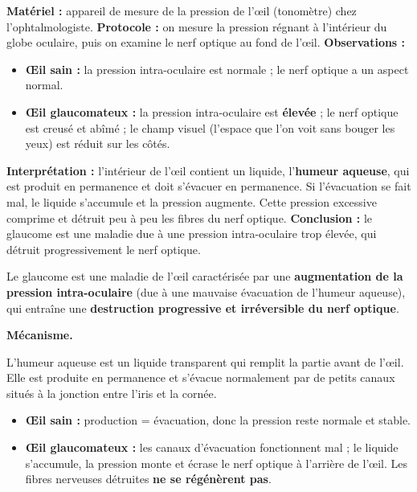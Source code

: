 \documentclass[11pt]{article}
\newcommand{\cle}[1]{{\popxbold\color{popdark}#1}}
\begin{document}
\begin{experience}
\textbf{Matériel :} appareil de mesure de la pression de l'œil (tonomètre) chez l'ophtalmologiste.
\textbf{Protocole :} on mesure la pression régnant à l'intérieur du globe oculaire, puis on examine le nerf optique au fond de l'œil.
\textbf{Observations :}
\begin{itemize}
    \item \textbf{Œil sain :} la pression intra-oculaire est normale ; le nerf optique a un aspect normal.
    \item \textbf{Œil glaucomateux :} la pression intra-oculaire est \textbf{élevée} ; le nerf optique est creusé et abîmé ; le champ visuel (l'espace que l'on voit sans bouger les yeux) est réduit sur les côtés.
\end{itemize}
\textbf{Interprétation :} l'intérieur de l'œil contient un liquide, l'\textbf{humeur aqueuse}, qui est produit en permanence et doit s'évacuer en permanence. Si l'évacuation se fait mal, le liquide s'accumule et la pression augmente. Cette pression excessive comprime et détruit peu à peu les fibres du nerf optique.
\textbf{Conclusion :} le glaucome est une maladie due à une pression intra-oculaire trop élevée, qui détruit progressivement le nerf optique.
\end{experience}

\begin{definition}[Glaucome]
Le \cle{glaucome} est une maladie de l'œil caractérisée par une \textbf{augmentation de la pression intra-oculaire} (due à une mauvaise évacuation de l'humeur aqueuse), qui entraîne une \textbf{destruction progressive et irréversible du nerf optique}.
\end{definition}

\textbf{Mécanisme.}\par
L'humeur aqueuse est un liquide transparent qui remplit la partie avant de l'œil. Elle est produite en permanence et s'évacue normalement par de petits canaux situés à la jonction entre l'iris et la cornée.
\begin{itemize}
    \item \textbf{Œil sain :} production = évacuation, donc la pression reste normale et stable.
    \item \textbf{Œil glaucomateux :} les canaux d'évacuation fonctionnent mal ; le liquide s'accumule, la pression monte et écrase le nerf optique à l'arrière de l'œil. Les fibres nerveuses détruites \textbf{ne se régénèrent pas}.
\end{itemize}
\end{document}
